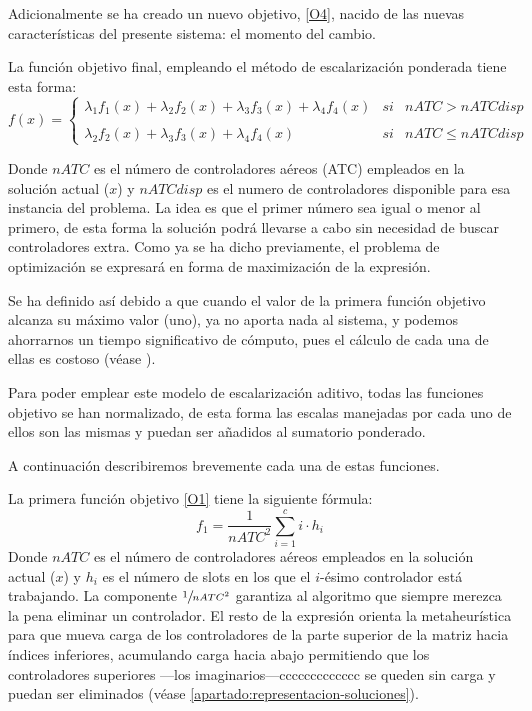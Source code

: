 Adicionalmente se ha creado un nuevo objetivo, \ref{O4}, nacido de las nuevas características del presente sistema: el momento del cambio.


La función objetivo final, empleando el método de escalarización ponderada tiene esta forma:
\[
	f(x)= \left\{ \begin{array}{lcc}
		\lambda_1 f_1(x) + \lambda_2 f_2(x) + \lambda_3 f_3(x) + \lambda_4 f_4(x) & si &  nATC > nATCdisp  \\
		                                                                          &    &                   \\
		\lambda_2 f_2(x) + \lambda_3 f_3(x) + \lambda_4 f_4(x)                    & si & nATC \le nATCdisp
	\end{array}
   \right.	
\]

Donde $nATC$ es el número de controladores aéreos (\gls{ATC}) empleados en la solución actual ($x$) y $nATCdisp$ es el numero de controladores disponible para esa instancia del problema. La idea es que el primer número sea igual o menor al primero, de esta forma la solución podrá llevarse a cabo sin necesidad de buscar controladores extra. Como ya se ha dicho previamente, el problema de optimización se expresará en forma de maximización de la expresión.

Se ha definido así debido a que cuando el valor de la primera función objetivo alcanza su máximo valor (uno), ya no aporta nada al sistema, y podemos ahorrarnos un tiempo significativo de cómputo, pues el cálculo de cada una de ellas es costoso (véase ).%

Para poder emplear este modelo de escalarización aditivo, todas las funciones objetivo se han normalizado, de esta forma las escalas manejadas por cada uno de ellos son las mismas y puedan ser añadidos al sumatorio ponderado.

A continuación describiremos brevemente cada una de estas funciones.

La primera función objetivo \ref{O1} tiene la siguiente fórmula:
\[ f_1 = \frac{1}{nATC^2} \sum_{i=1}^c i\cdot h_i \]
Donde $nATC$ es el número de controladores aéreos empleados en la solución actual ($x$) y $h_i$ es el número de slots en los que el $i$-ésimo controlador está trabajando. La componente $\sfrac{1}{nATC^2}$ garantiza al algoritmo que siempre merezca la pena eliminar un controlador. El resto de la expresión orienta la metaheurística para que mueva carga de los controladores de la parte superior de la matriz hacia índices inferiores, acumulando carga hacia abajo permitiendo que los controladores superiores ---los imaginarios---ccccccccccccc se queden sin carga y puedan ser eliminados (véase \autoref{apartado:representacion-soluciones}).

